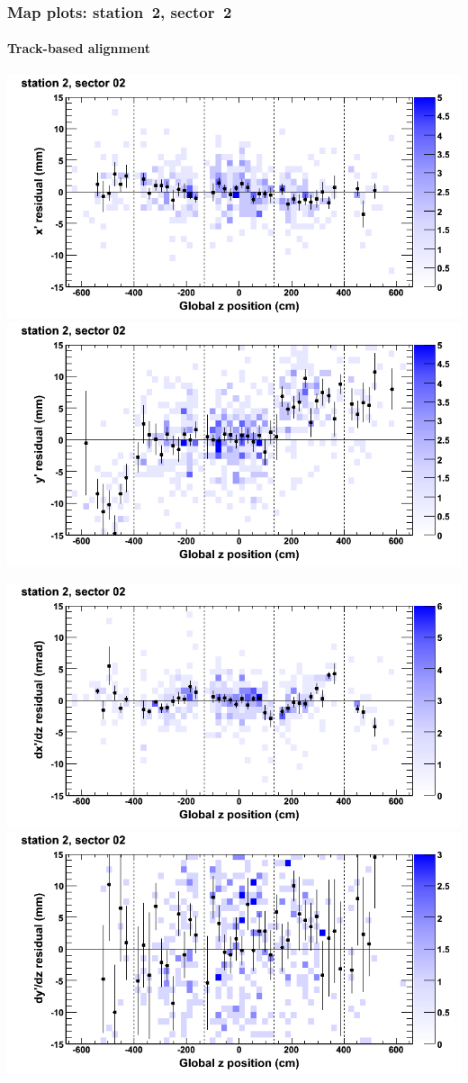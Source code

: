 \documentclass[compress]{beamer}
\begin{document}
\begin{frame}
\frametitle{Map plots: station~2, sector~2}
\framesubtitle{Track-based alignment}
\includegraphics[width=0.5\linewidth]{mapplots_re05/DTvsz_st2sec02_x.png}
\includegraphics[width=0.5\linewidth]{mapplots_re05/DTvsz_st2sec02_y.png}

\includegraphics[width=0.5\linewidth]{mapplots_re05/DTvsz_st2sec02_dxdz.png}
\includegraphics[width=0.5\linewidth]{mapplots_re05/DTvsz_st2sec02_dydz.png}
\end{frame}
\end{document}
